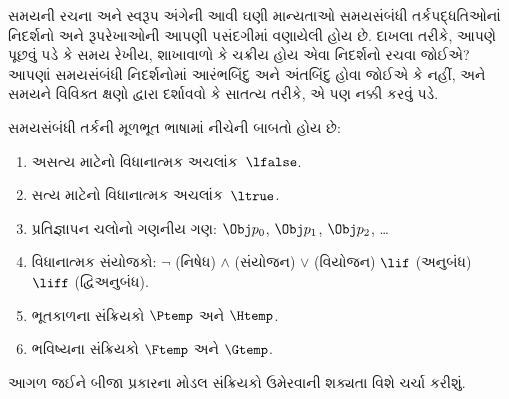 સમયની રચના અને સ્વરૂપ અંગેની આવી ઘણી માન્યતાઓ સમયસંબંધી
તર્કપદ્ધતિઓનાં નિદર્શનો અને રૂપરેખાઓની આપણી પસંદગીમાં વણાયેલી હોય છે.
દાખલા તરીકે, આપણે પૂછવું પડે કે સમય રેખીય, શાખાવાળો કે ચક્રીય
હોય એવા નિદર્શનો રચવા જોઈએ? આપણાં સમયસંબંધી નિદર્શનોમાં આરંભબિંદુ અને
અંતબિંદુ હોવા જોઈએ કે નહીં, અને સમયને વિવિક્ત ક્ષણો દ્વારા
દર્શાવવો કે સાતત્ય તરીકે, એ પણ નક્કી કરવું પડે.
\endgroup

\begingroup
\makeatletter{}\makeatother


\label{guunit:OLP-0478}


\begin{defn}
સમયસંબંધી તર્કની મૂળભૂત ભાષામાં નીચેની બાબતો હોય છે:
\begin{enumerate}
  \item અસત્ય માટેનો વિધાનાત્મક અચલાંક~$\lfalse$.
  \item સત્ય માટેનો વિધાનાત્મક અચલાંક~$\ltrue$.
  \item પ્રતિજ્ઞાપન ચલોનો ગણનીય ગણ: $\Obj
    p_0$, $\Obj p_1$, $\Obj p_2$, \dots
  \item વિધાનાત્મક સંયોજકો: \startycommalist
  \ycomma $\lnot$ (નિષેધ)%
  \ycomma $\land$ (સંયોજન)%
  \ycomma $\lor$ (વિયોજન)%
  \ycomma $\lif$ (અનુબંધ)%
  \ycomma $\liff$ (દ્વિઅનુબંધ).
  \item ભૂતકાળના સંક્રિયકો $\Ptemp$ અને $\Htemp$.
  \item ભવિષ્યના સંક્રિયકો $\Ftemp$ અને $\Gtemp$.
\end{enumerate}
\end{defn}

આગળ જઈને બીજા પ્રકારના મોડલ સંક્રિયકો ઉમેરવાની શક્યતા વિશે ચર્ચા કરીશું.

